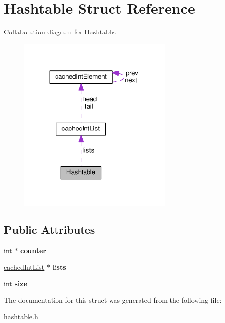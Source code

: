 \hypertarget{structHashtable}{}\section{Hashtable Struct Reference}
\label{structHashtable}


Collaboration diagram for Hashtable\+:
\nopagebreak
\begin{figure}[H]
\begin{center}
\leavevmode
\includegraphics[width=215pt]{structHashtable__coll__graph}
\end{center}
\end{figure}
\subsection*{Public Attributes}
\begin{DoxyCompactItemize}
\item 
int $\ast$ {\bfseries counter}\hypertarget{structHashtable_a99f7c11aa20bbd066528843438a42958}{}\label{structHashtable_a99f7c11aa20bbd066528843438a42958}

\item 
\hyperlink{structcachedIntList}{cached\+Int\+List} $\ast$ {\bfseries lists}\hypertarget{structHashtable_ac4140ebb0209a40547999cce896fe17c}{}\label{structHashtable_ac4140ebb0209a40547999cce896fe17c}

\item 
int {\bfseries size}\hypertarget{structHashtable_ad8deca1b493e081c8bd9e45580b3bd53}{}\label{structHashtable_ad8deca1b493e081c8bd9e45580b3bd53}

\end{DoxyCompactItemize}


The documentation for this struct was generated from the following file\+:\begin{DoxyCompactItemize}
\item 
hashtable.\+h\end{DoxyCompactItemize}
